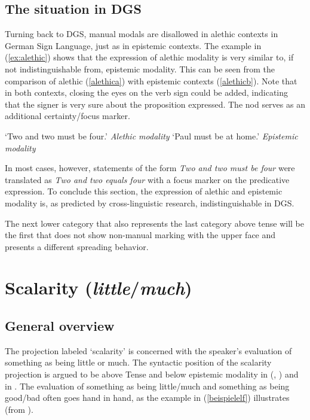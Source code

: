 \subsection{The situation in DGS}
Turning back to DGS, manual modals are disallowed in alethic contexts in German Sign Language, just as in epistemic contexts. The example in (\ref{ex:alethic}) shows that the expression of alethic modality is very similar to, if not indistinguishable from, epistemic modality. This can be seen from the comparison of alethic (\ref{alethica}) with epistemic contexts (\ref{alethicb}). Note that in both contexts, closing the eyes on the verb sign could be added, indicating that the signer is very sure about the proposition expressed. The nod serves as an additional certainty/focus marker.




\begin{exe}
\ex\label{ex:alethic}\begin{xlist}
\ex {}
\glt `Two and two must be four.' \label{alethica}\hfill{\textit{Alethic modality}}
\ex  {}
\glt `Paul must be at home.' \label{alethicb}\hfill{\textit{Epistemic modality}}
\end{xlist}
\end{exe}





\noindent In most cases, however, statements of the form \textit{Two and two must be four} were translated as \textit{Two and two equals four} with a focus marker on the predicative expression. To conclude this section, the expression of alethic and epistemic modality is, as predicted by cross-linguistic research, indistinguishable in DGS. 



The next lower category that also represents the last category above tense will be the first that does not show non-manual marking with the upper face and presents a different spreading behavior.

\section{Scalarity (\textit{little}/\textit{much})}\label{scalarity}

\subsection{General overview}
The projection labeled `scalarity' is concerned with the speaker's evaluation of something as being little or much. The syntactic position of the scalarity projection is argued to be above Tense and below epistemic modality in \citeauthor{hole2015distributed} (\citeyear{hole2015distributed}, \citeyear{hole2017crosslinguistic}) and in \citet{bross2017scope}. The evaluation of something as being little/much and something as being good/bad often goes hand in hand, as the example in (\ref{beispielelf}) illustrates (from \citealt[51]{hole2015distributed}).

